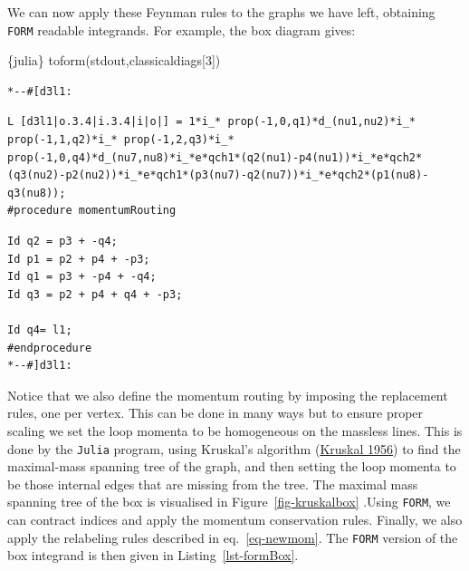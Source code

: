 \documentclass[
  11pt,
  a4paper,
  DIV=11,
  numbers=noendperiod,
  oneside]{scrreprt}
\newenvironment{Shaded}{\begin{snugshade}}{\end{snugshade}}
\newcommand{\DecValTok}[1]{\textcolor[rgb]{0.68,0.00,0.00}{#1}}
\newcommand{\InformationTok}[1]{\textcolor[rgb]{0.37,0.37,0.37}{#1}}
\newcommand{\NormalTok}[1]{\textcolor[rgb]{0.00,0.23,0.31}{#1}}
\DeclareRobustCommand{\[}{\begin{equation}}
\DeclareRobustCommand{\]}{\end{equation}}
\begin{document}
We can now apply these Feynman rules to the graphs we have left,
obtaining \texttt{FORM} readable integrands. For example, the box
diagram gives:

\begin{Shaded}
\begin{Highlighting}[]
\InformationTok{\textasciigrave{}\textasciigrave{}\textasciigrave{}\{julia\}}
\NormalTok{toform(stdout,classicaldiags[}\DecValTok{3}\NormalTok{])}
\InformationTok{\textasciigrave{}\textasciigrave{}\textasciigrave{}}
\end{Highlighting}
\end{Shaded}

\begin{verbatim}
*--#[d3l1:
\end{verbatim}

\begin{verbatim}
L [d3l1|o.3.4|i.3.4|i|o|] = 1*i_* prop(-1,0,q1)*d_(nu1,nu2)*i_* prop(-1,1,q2)*i_* prop(-1,2,q3)*i_* prop(-1,0,q4)*d_(nu7,nu8)*i_*e*qch1*(q2(nu1)-p4(nu1))*i_*e*qch2*(q3(nu2)-p2(nu2))*i_*e*qch1*(p3(nu7)-q2(nu7))*i_*e*qch2*(p1(nu8)-q3(nu8));
#procedure momentumRouting
\end{verbatim}

\begin{verbatim}
Id q2 = p3 + -q4;
Id p1 = p2 + p4 + -p3;
Id q1 = p3 + -p4 + -q4;
Id q3 = p2 + p4 + q4 + -p3;

Id q4= l1;
#endprocedure
*--#]d3l1:
\end{verbatim}

Notice that we also define the momentum routing by imposing the
replacement rules, one per vertex. This can be done in many ways but to
ensure proper scaling we set the loop momenta to be homogeneous on the
massless lines. This is done by the \texttt{Julia} program, using
Kruskal's algorithm (\protect\hyperlink{ref-Kruskal:1956}{Kruskal 1956})
to find the maximal-mass spanning tree of the graph, and then setting
the loop momenta to be those internal edges that are missing from the
tree. The maximal mass spanning tree of the box is visualised in
Figure~\ref{fig-kruskalbox} .Using \texttt{FORM}, we can contract
indices and apply the momentum conservation rules. Finally, we also
apply the relabeling rules described in eq.~\ref{eq-newmom}. The
\texttt{FORM} version of the box integrand is then given in
Listing~\ref{lst-formBox}.
\end{document}
